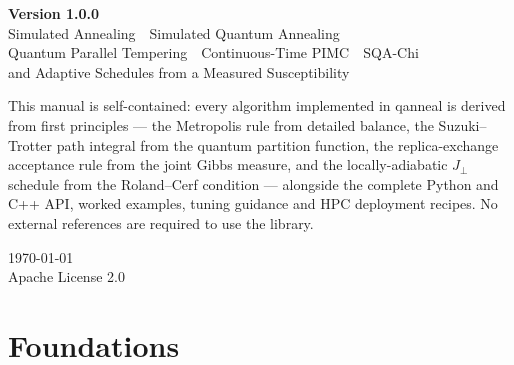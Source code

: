 \documentclass[11pt,a4paper]{report}
\newcommand{\qv}{\textsf{qanneal}}
\newcommand{\Jp}{J_{\perp}}
\begin{document}
\begin{titlepage}
\vspace*{10.2cm}
\begin{center}
\begin{minipage}{0.86\textwidth}
\centering
{\Large\color{qnavy}\bfseries Version 1.0.0}\\[1.2em]
{\large\color{qgray}
Simulated Annealing \,\textbullet\, Simulated Quantum Annealing\\[0.25em]
Quantum Parallel Tempering \,\textbullet\, Continuous-Time PIMC \,\textbullet\, SQA-Chi\\[0.25em]
and Adaptive Schedules from a Measured Susceptibility}\\[2.2em]
\begin{tcolorbox}[colback=qnavy!4,colframe=qnavy!30,arc=2mm,boxrule=0.5pt,
                  width=0.92\textwidth,left=5mm,right=5mm,top=3mm,bottom=3mm]
\small This manual is self-contained: every algorithm implemented in \qv{} is
derived from first principles --- the Metropolis rule from detailed balance,
the Suzuki--Trotter path integral from the quantum partition function, the
replica-exchange acceptance rule from the joint Gibbs measure, and the
locally-adiabatic $\Jp$ schedule from the Roland--Cerf condition --- alongside
the complete Python and C++ API, worked examples, tuning guidance and HPC
deployment recipes. No external references are required to use the library.
\end{tcolorbox}
\vspace{2.0em}
{\color{qgray}\large \today\\[0.4em] Apache License 2.0}
\end{minipage}
\end{center}
\end{titlepage}

{\hypersetup{linkcolor=qnavy}\tableofcontents}
\cleardoublepage
{}

\part{Foundations}



\end{document}
